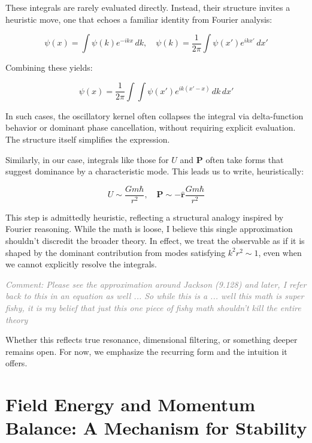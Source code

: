 \documentclass {article}
\renewcommand\vec{\mathbf}
\let\OldHat\hat
\renewcommand{\hat}[1]{\OldHat{\mathbf{#1}}}
\newcommand{\comment}[1]{\textcolor{gray}{\small\textit{Comment: #1}}}
\begin{document}
These integrals are rarely evaluated directly. Instead, their structure invites a heuristic move, one that echoes a familiar identity from Fourier analysis:

\begin{equation}
\psi(x) = \int \psi(k) e^{-ikx} \, dk, \quad
\psi(k) = \frac{1}{2\pi} \int \psi(x') e^{ikx'} \, dx'
\end{equation}

Combining these yields:

\begin{equation}
\psi(x) = \frac{1}{2\pi} \int \int \psi(x') e^{ik(x' - x)} \, dk \, dx'
\end{equation}

In such cases, the oscillatory kernel often collapses the integral via delta-function behavior or dominant phase cancellation, without requiring explicit evaluation. The structure itself simplifies the expression.


Similarly, in our case, integrals like those for \(U\) and \(\vec{P}\) often take forms that suggest dominance by a characteristic mode. This leads us to write, heuristically:


\begin{equation}
U \sim \frac{Gm\hbar}{r^2}, \quad
\vec{P}  \sim -\hat{r} \frac{Gm\hbar}{r^2}
\end{equation}

This step is admittedly heuristic, reflecting a structural analogy inspired by Fourier reasoning. While the math is loose, I believe this single approximation shouldn’t discredit the broader theory. In effect, we treat the observable as if it is shaped by the dominant contribution from modes satisfying \(k^2 r^2 \sim 1\), even when we cannot explicitly resolve the integrals.

\comment{Please see the approximation around Jackson (9.128) and later, I refer back to this in an equation as well ... So while this is a ... well this math is super fishy, it is my belief that just this one piece of fishy math shouldn't kill the entire theory}

Whether this reflects true resonance, dimensional filtering, or something deeper remains open.  For now, we emphasize the recurring form and the intuition it offers.





\section{Field Energy and Momentum Balance: A Mechanism for Stability}
\label{sec:stability}
\end{document}
